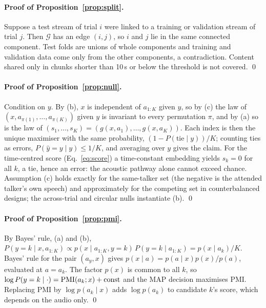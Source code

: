 \paragraph{Proof of Proposition~\ref{prop:split}.} Suppose a test stream of trial $i$ were
linked to a training or validation stream of trial $j$. Then $\mathcal G$ has an edge
$(i,j)$, so $i$ and $j$ lie in the same connected component. Test folds are unions of whole
components and training and validation data come only from the other components, a
contradiction. Content shared only in chunks shorter than 10\,s or
below the threshold is not covered. \qed

\paragraph{Proof of Proposition~\ref{prop:null}.} Condition on $y$. By (b), $x$ is independent of $a_{1:K}$ given $y$, so by (c)
the law of $(x,a_{\pi(1)},\dots,a_{\pi(K)})$ given $y$ is invariant to every permutation
$\pi$, and by (a) so is the law of $(s_1,\dots,s_K)=(g(x,a_1),\dots,g(x,a_K))$. Each index is
then the unique maximiser with the same probability, $(1-P(\text{tie}\mid y))/K$; counting
ties as errors, $P(\hat y=y\mid y)\le 1/K$, and averaging over $y$ gives the claim. For the time-centred score (Eq.~\ref{eq:score}) a time-constant
embedding yields $s_k=0$ for all $k$, a tie, hence an error: the acoustic pathway alone
cannot exceed chance. Assumption (c) holds exactly for the same-talker set (the negative is
the attended talker's own speech) and approximately for the competing set in
counterbalanced designs; the across-trial and circular nulls instantiate (b). \qed

\paragraph{Proof of Proposition~\ref{prop:pmi}.} By Bayes' rule, (a) and (b),
$P(y=k\mid x,a_{1:K})\propto p(x\mid a_{1:K},y=k)\,P(y=k\mid a_{1:K})=p(x\mid a_k)/K$.
Bayes' rule for the pair $(a_y,x)$ gives $p(x\mid a)=p(a\mid x)p(x)/p(a)$, evaluated at
$a=a_k$. The factor $p(x)$ is common to all $k$, so
$\log P(y=k\mid\cdot)=\mathrm{PMI}(a_k;x)+\text{const}$ and the MAP decision maximises PMI.
Replacing PMI by $\log p(a_k\mid x)$ adds $\log p(a_k)$ to candidate $k$'s score, which
depends on the audio only. \qed

